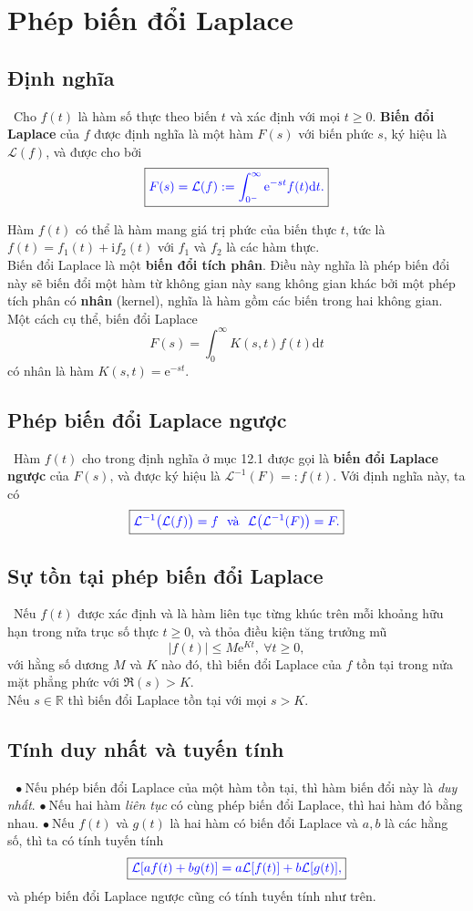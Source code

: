 \documentclass[10pt, a4paper]{article}
\begin{document}
	\section{Phép biến đổi Laplace}
	\subsection{Định nghĩa}
	\quad\,\,\,Cho $f(t)$ là hàm số thực theo biến $t$ và xác định với mọi $t\ge0$. \textbf{\color{red}Biến đổi Laplace} của $f$ được định nghĩa là một hàm $F(s)$ với biến phức $s$, ký hiệu là $\mathcal L(f)$, và được cho bởi $$\boxed{\color{blue}F(s)=\mathcal L(f):=\displaystyle\int_{0^-}^\infty\mathrm e^{-st}f(t)\text{d}t.}$$
	
	Hàm $f(t)$ có thể là hàm mang giá trị phức của biến thực $t$, tức là $f(t)=f_1(t)+\mathrm if_2(t)$ với $f_1$ và $f_2$ là các hàm thực.\\
	
	Biến đổi Laplace là một \textbf{\color{red}biến đổi tích phân}. Điều này nghĩa là phép biến đổi này sẽ biến đổi một hàm từ không gian này sang không gian khác bởi một phép tích phân có \textbf{\color{red}nhân} (kernel), nghĩa là hàm gồm các biến trong hai không gian. Một cách cụ thể, biến đổi Laplace $$F(s)=\int_{0}^\infty K(s,t)f(t)\text{d}t$$
	có nhân là hàm $K(s,t)=\mathrm e^{-st}$.
	\subsection{Phép biến đổi Laplace ngược}
	\quad\,\,\,Hàm $f(t)$ cho trong định nghĩa ở mục 12.1 được gọi là \textbf{\color{red}biến đổi Laplace ngược} của $F(s)$, và được ký hiệu là $\mathcal L^{-1}(F)=:f(t)$. Với định nghĩa này, ta có $$\boxed{\color{blue}\mathcal L^{-1}\big(\mathcal L(f)\big)=f~~\text{và}~~\mathcal L\big(\mathcal L^{-1}(F)\big)=F.}$$
	\subsection{Sự tồn tại phép biến đổi Laplace}
	\quad\,\,\,Nếu $f(t)$ được xác định và là hàm liên tục từng khúc trên mỗi khoảng hữu hạn trong nửa trục số thực $t\ge0$, và thỏa điều kiện tăng trưởng mũ $$|f(t)|\le M\mathrm e^{Kt},~\forall t\ge0,$$
	với hằng số dương $M$ và $K$ nào đó, thì biến đổi Laplace của $f$ tồn tại trong nửa mặt phẳng phức với $\mathfrak R(s)>K$.\\
	
	Nếu $s\in\mathbb R$ thì biến đổi Laplace tồn tại với mọi $s>K$.
	\subsection{Tính duy nhất và tuyến tính}
	\quad~\,$\bullet~$Nếu phép biến đổi Laplace của một hàm tồn tại, thì hàm biến đổi này là \textit{duy nhất}.
	\vskip7pt
	$\bullet~$Nếu hai hàm \textit{liên tục} có cùng phép biến đổi Laplace, thì hai hàm đó bằng nhau.
	\vskip7pt
	$\bullet~$Nếu $f(t)$ và $g(t)$ là hai hàm có biến đổi Laplace và $a,b$ là các hằng số, thì ta có tính tuyến tính
	$$\boxed{\color{blue}\mathcal L[af(t)+bg(t)]=a\mathcal L[f(t)]+b\mathcal L[g(t)],}$$
	và phép biến đổi Laplace ngược cũng có tính tuyến tính như trên.\\
	
\end{document}
